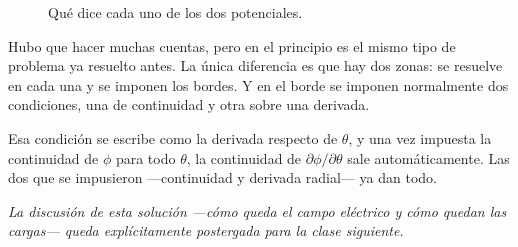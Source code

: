 \documentclass[12pt,a4paper]{article}
\begin{document}
\begin{figure}[H]
  \centering
  
  \caption{Qué dice cada uno de los dos potenciales.}
\end{figure}

\begin{notebox}
Hubo que hacer muchas cuentas, pero en el principio es el mismo tipo de problema
ya resuelto antes. La única diferencia es que hay dos zonas: se resuelve en cada
una y se imponen los bordes. Y en el borde se imponen normalmente dos
condiciones, una de continuidad y otra sobre una derivada.
\end{notebox}

\begin{notebox}
Esa condición se escribe como la derivada respecto de $\theta$, y una vez
impuesta la continuidad de $\phi$ para todo $\theta$, la continuidad de
$\partial\phi/\partial\theta$ sale automáticamente. Las dos que se impusieron
---continuidad y derivada radial--- ya dan todo.
\end{notebox}

\vspace{1em}
\noindent\emph{La discusión de esta solución ---cómo queda el campo eléctrico y
cómo quedan las cargas--- queda explícitamente postergada para la clase
siguiente.}
\end{document}
